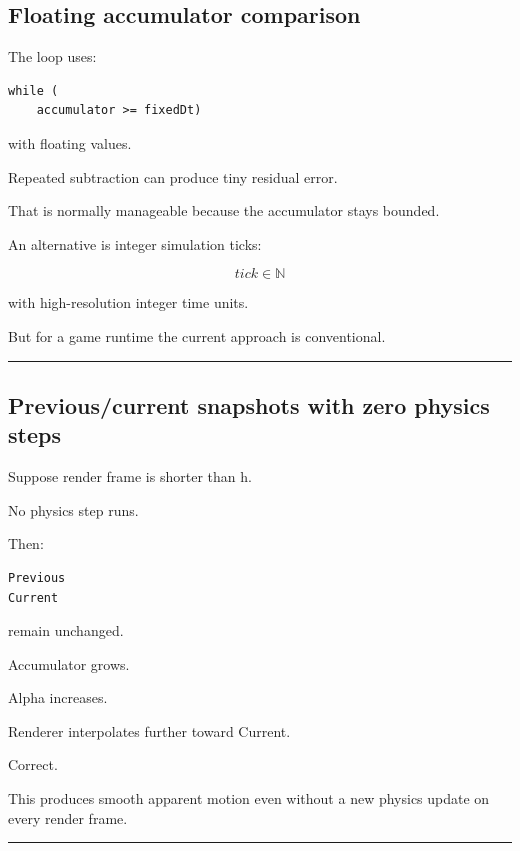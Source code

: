 \subsection{Floating accumulator comparison}\label{06-engine-ii-ch038-floating-accumulator-comparison}

The loop uses:

\begin{verbatim}
while (
    accumulator >= fixedDt)
\end{verbatim}

with floating values.

Repeated subtraction can produce tiny residual error.

That is normally manageable because the accumulator stays bounded.

An alternative is integer simulation ticks:

\[
tick\in\mathbb N
\]

with high-resolution integer time units.

But for a game runtime the current approach is conventional.

\begin{center}\rule{0.5\linewidth}{0.5pt}\end{center}

\subsection{Previous/current snapshots with zero physics steps}\label{06-engine-ii-ch038-previouscurrent-snapshots-with-zero-physics-steps}

Suppose render frame is shorter than h.

No physics step runs.

Then:

\begin{verbatim}
Previous
Current
\end{verbatim}

remain unchanged.

Accumulator grows.

Alpha increases.

Renderer interpolates further toward Current.

Correct.

This produces smooth apparent motion even without a new physics update on every render frame.

\begin{center}\rule{0.5\linewidth}{0.5pt}\end{center}

